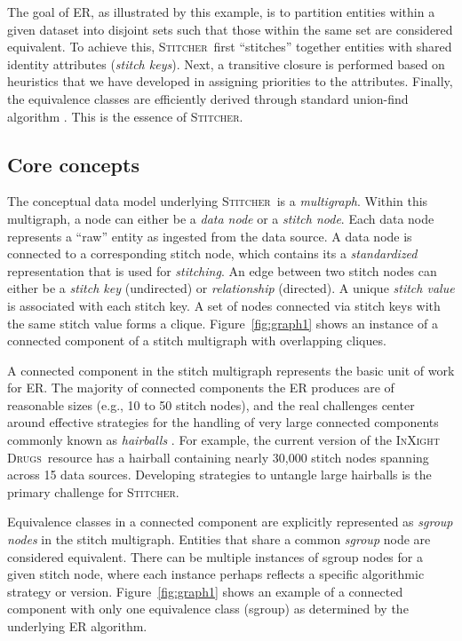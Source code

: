 \documentclass{bmcart}
\newcommand\st{\textsc{Stitcher}}
\newcommand\ix{\textsc{InXight Drugs}}
\begin{document}
The goal of ER, as illustrated by this example, is to partition
entities within a given dataset into disjoint sets such that those
within the same set are considered equivalent. To achieve this,
\st\ first ``stitches'' together entities with shared identity
attributes (\emph{stitch keys}). Next, a transitive closure is
performed based on heuristics that we have developed in assigning
priorities to the attributes. Finally, the equivalence classes are
efficiently derived through standard  union-find algorithm
\cite{Cormen2001}. This is the essence of \st.

\subsection*{Core concepts}
The conceptual data model underlying \st\ is a \emph{multigraph}.
Within this multigraph, a node can either be a \emph{data node} or a \emph{stitch node}. 
Each data node represents a ``raw'' entity as ingested from the data source. 
A data node is connected to a corresponding stitch node, which contains its 
a \emph{standardized} representation that is used
for \emph{stitching}. An edge between two stitch nodes can either be
a \emph{stitch key} (undirected) or \emph{relationship} (directed). 
A unique \emph{stitch value} is associated with each stitch key.  
A set of nodes connected via stitch keys with the same stitch value forms a clique. 
Figure~\ref{fig:graph1} shows an instance of a
connected component of a stitch multigraph with overlapping cliques. 

A connected component in the stitch multigraph represents the basic
unit of work for ER. The majority of connected components the ER produces 
are of reasonable sizes (e.g., 10 to 50 stitch nodes), and the
real challenges center around effective strategies for the handling of very
large connected components commonly known
as \emph{hairballs} \cite{Croset2015}. For example, the current
version of the \ix\ resource has a hairball containing nearly 30,000 stitch
nodes spanning across 15 data sources. Developing strategies to
untangle large hairballs is the primary challenge for \st.

Equivalence classes in a connected component are explicitly
represented as \emph{sgroup nodes} in the stitch multigraph. Entities
that share a common \emph{sgroup} node are considered equivalent.
There can be multiple instances of sgroup nodes for a given stitch
node, where each instance perhaps reflects a specific algorithmic 
strategy or version. Figure~\ref{fig:graph1} shows an example of 
a connected component with only one equivalence class (sgroup) as determined 
by the underlying ER algorithm. 
\end{document}
